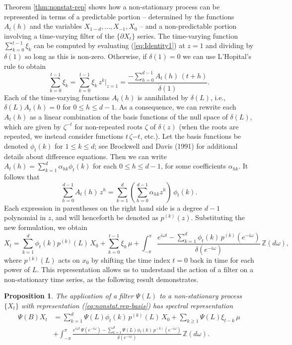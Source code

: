 \documentclass[a4paper]{book}
\def\ZZ{\mathbb Z}
\newtheorem{Proposition}{Proposition}
\begin{document}
  Theorem  \ref{thm:nonstat-rep} shows how a non-stationary process
  can be represented in  terms of a predictable
  portion -- determined by the functions $A_{t} (h)$ and the
  variables $X_{1-d}, \ldots, X_{-1}, X_0$ -- and a
  non-predictable portion involving a time-varying filter of the $\{
  \partial X_t \}$ series. 
  The time-varying function $\sum_{k=0}^{t-1} \xi_k $ can be computed
  by evaluating (\ref{eq:Identity1}) at $z=1$ and dividing by $\delta (1)$
   so long as this is non-zero.  Otherwise, if $\delta (1) = 0$ we can
   use L'Hopital's rule to obtain
  \[
   \sum_{k=0}^{t-1} \xi_k = \sum_{k=0}^{t-1} \xi_k \, z^k \vert_{z = 1}
   = \frac{ - \sum_{h=0}^{d-1} A_t (h) \, (t+h) }{ \dot{\delta} (1)}.
  \]
     Each of the time-varying functions $A_t (h)$ is annihilated
 by $\delta (L)$, i.e., $\delta (L) A_{t} (h) = 0$ for $0 \leq
 h \leq d-1$.   As a consequence, we can rewrite each $A_{t} (h)$ as a linear
 combination of the basis functions of the null space of $\delta
 (L)$, which are given by $\zeta^{-t}$ for non-repeated roots $\zeta$
  of $\delta (z)$ (when the roots are repeated, we instead consider
  functions $t \, \zeta{-t}$, etc.).  
    Let the basis  functions be denoted
    $\phi_t (k) $ for $1 \leq k \leq d$; see Brockwell and Davis (1991)
     for additional details about difference equations.  Then we can
 write $A_{t} (h) = \sum_{k=1}^d \alpha_{hk} \phi_t (k)$ for each $0 \leq
 h \leq d-1$, for some coefficients $\alpha_{hk}$.  It follows that
\[
 \sum_{h=0}^{d-1} A_{t}(h) \, z^h = \sum_{k=1}^d \left(
 \sum_{h=0}^{d-1} \alpha_{hk} z^h \right)  \, \phi_t (k).
\]
 Each expression in parentheses on the right hand side is a degree
 $d-1$ polynomial in $z$, and will henceforth be denoted as $p^{(k)}
 (z)$.   Substituting the new formulation, we obtain
\begin{equation}
\label{eq:nonstat.rep-basis}
 X_t = \sum_{k=1}^d \phi_t (k) p^{(k)} (L) \, X_{0} + 
  \sum_{k=0}^{t-1} \xi_k \, \mu  +  \int_{-\pi}^{\pi}
 \frac{ e^{i \omega t} - \sum_{k=1}^d \phi_t (k) \, 
 p^{(k)} ( e^{-i \omega  } )}{ \delta (e^{-i \omega}) } \,  \ZZ (d\omega),
\end{equation}
 where $p^{(k)} (L)$ acts on $x_0$ by shifting the time index $t=0$
 back in time for each power of $L$.  
  This representation allows us to 
  understand the action of a filter on a non-stationary time series,
  as the following result demonstrates.
  
\begin{Proposition}
  \label{prop:filter-nonstat}
  The application of a filter $\Psi (L)$ to a non-stationary process $\{ X_t \}$
  with representation  (\ref{eq:nonstat.rep-basis}) has spectral representation
 \begin{align*}
 \Psi (B) X_t & =   \sum_{k=1}^d \Psi (L) \phi_t (k) \, p^{(k)} (L) \, X_{0}  +
   \sum_{k \geq 1}  \Psi (L)  \xi_{t-k} \, \mu \\
   & +   \int_{-\pi}^{\pi}
   \frac{ e^{i \omega t} \, \Psi (e^{-i \omega}) 
   - \sum_{k=1}^d \Psi (L) \phi_t (k) \, p^{(k)} (e^{-i \omega}) 
    }{ \delta (e^{-i \omega}) } \, \ZZ (d\omega).
 \end{align*}
 \end{Proposition}
  
\end{document}
